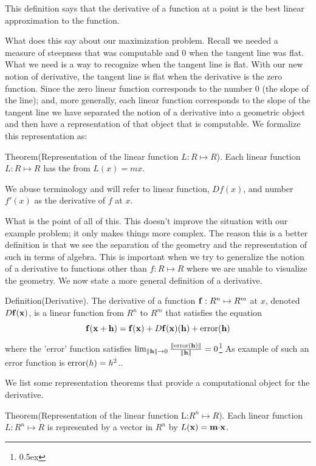 This definition says that the derivative of a function at a point is 
the best linear approximation to the function. 

What does this say about our maximization problem. Recall we needed a 
measure of steepness that was computable and 0 when the tangent line was flat.
What we need is a way to recognize when the tangent line is flat. With 
our new notion of derivative, the tangent line is flat when the derivative 
is the zero function. Since the zero linear function corresponds to the 
number 0 (the slope of the line); and, more generally, each 
linear function corresponds to the slope of the tangent line we have separated 
the notion of a derivative into a geometric object and then have 
a representation of that object that is computable. We formalize this 
representation as:

\proclaim Theorem(Representation of the linear function $L:R \mapsto R$). 
Each linear function
$L:R \mapsto R$ has the from $L(x) = m x$. 

We abuse terminology and will refer to linear function, $Df(x)$, and number 
$f'(x)$ as the derivative of $f$ at $x$. 

What is the point of all of this. This doesn't improve the situation with 
our example problem; it only makes things more complex. The reason this 
is a better definition is that we see the separation of the geometry and 
the representation of such in terms of algebra. This is important when 
we try to generalize the notion of a derivative to functions other than 
$f:R \mapsto R$ where we are unable to visualize the geometry. 
We now state a more general definition of a derivative.

\proclaim Definition(Derivative). The derivative of a function 
${\bf f\/}:R^n \mapsto R^m$ 
at $x$, denoted $D{\bf f\/}({\bf x\/})$, is a linear function 
from $R^n$ to $R^m$ 
that satisfies the equation
$$
{\bf f\/}({\bf x+h\/}) ={\bf f\/}({\bf x\/}) + 
D{\bf f\/}({\bf x\/})({\bf h\/}) + {\rm error\/}({\bf h\/})
$$
where the 'error' function satisfies 
$\lim_{\|{\bf h\/}\| \rightarrow 0} 
{\|{\rm error\/}({\bf h\/})\| \over \|{\bf h\/}\|} = 0$\footnote{\kern 0.5pt \raise 0.5ex \hbox{\ddag}}
{As example of such an error function is ${\rm error\/}(h) = h^2$.}.


We list some representation theorems that provide a computational object for 
the derivative.

\proclaim Theorem(Representation of the linear function L:$R^n\mapsto R$). 
Each linear function
$L:R^n \mapsto R$ is represented by a vector in $R^n$ by
 $L({\bf x\/}) = {\bf m\/} {\bf \cdot\/} {\bf x\/}$. 

